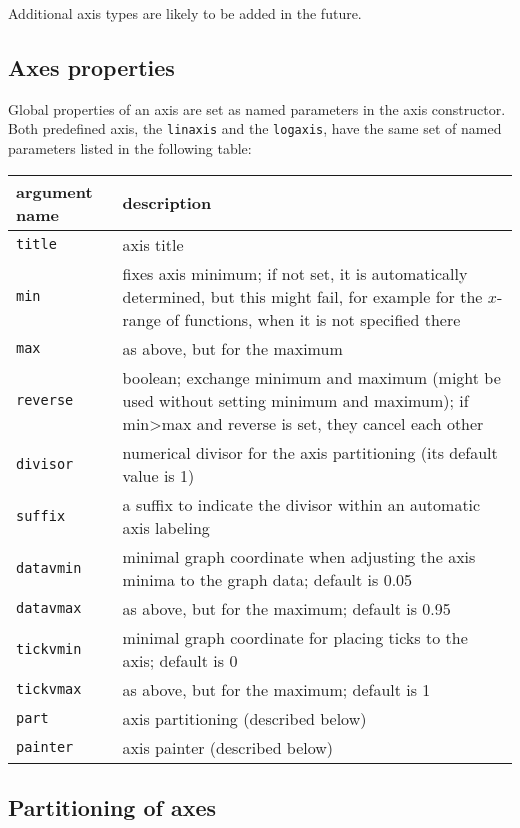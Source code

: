 Additional axis types are likely to be added in the future.

\subsection{Axes properties}

Global properties of an axis are set as named parameters in the axis
constructor. Both predefined axis, the \verb|linaxis| and the
\verb|logaxis|, have the same set of named parameters listed in the
following table:

\medskip
\begin{tabularx}{\linewidth}{l>{\raggedright\arraybackslash}X}
argument name&description\\
\hline
\texttt{title}&axis title\\
\texttt{min}&fixes axis minimum; if not set, it is automatically determined, but this might fail, for example for the $x$-range of functions, when it is not specified there\\
\texttt{max}&as above, but for the maximum\\
\texttt{reverse}&boolean; exchange minimum and maximum (might be used without setting minimum and maximum); if min>max and reverse is set, they cancel each other\\
\texttt{divisor}&numerical divisor for the axis partitioning (its default value is 1)\\
\texttt{suffix}&a suffix to indicate the divisor within an automatic axis labeling\\
\texttt{datavmin}&minimal graph coordinate when adjusting the axis minima to the graph data; default is 0.05\\
\texttt{datavmax}&as above, but for the maximum; default is 0.95\\
\texttt{tickvmin}&minimal graph coordinate for placing ticks to the axis; default is 0\\
\texttt{tickvmax}&as above, but for the maximum; default is 1\\
\texttt{part}&axis partitioning (described below)\\
\texttt{painter}&axis painter (described below)\\
\end{tabularx}
\medskip

\subsection{Partitioning of axes}


